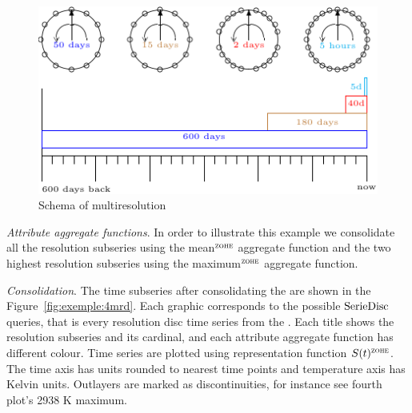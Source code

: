\begin{figure}[tp]
  \centering
  \setlength{\unitlength}{1.3mm}
  \includegraphics{fig_exemple_window.pdf}
  \caption{Schema of multiresolution}
  \label{fig:exemple:window}
\end{figure}

\emph{Attribute aggregate functions}.  In order to illustrate this
example we consolidate all the resolution subseries using the
mean$^\zohe{}$ aggregate function and the two highest resolution
subseries using the maximum$^\zohe{}$ aggregate function. 



\emph{Consolidation}. The time subseries after consolidating the
 are shown in the Figure~\ref{fig:exemple:4mrd}. 
Each graphic corresponds to the possible $\operatorname{SerieDisc}$ queries, that is
every resolution disc time series from the . Each title
shows the resolution subseries and its cardinal, and each attribute
aggregate function has different colour.  
%
Time series are plotted using \zohe{} representation function
$S(t)^\zohe{}$. The time axis has  units rounded to nearest
time points and temperature axis has Kelvin units. Outlayers are
marked as discontinuities, for instance see fourth plot's 2938 K
maximum.


